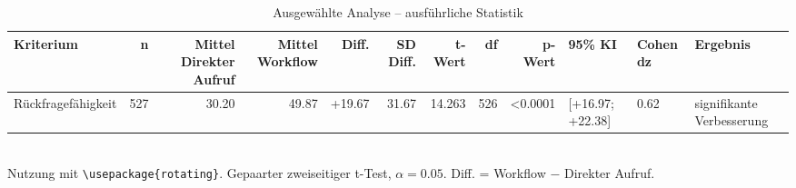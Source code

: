 \begin{table}
\centering
\caption{Ausgewählte Analyse -- ausführliche Statistik}
\begin{tabular}{lrrrrrrrrlll}
\toprule
Kriterium & n & Mittel Direkter Aufruf & Mittel Workflow & Diff. & SD Diff. & t-Wert & df & p-Wert & 95\% KI & Cohen dz & Ergebnis \\
\midrule
Rückfragefähigkeit & 527 & 30.20 & 49.87 & +19.67 & 31.67 & 14.263 & 526 & <0.0001 & [+16.97; +22.38] & 0.62 & signifikante Verbesserung \\
\bottomrule
\end{tabular}
\\[2mm]
\footnotesize Nutzung mit \texttt{\textbackslash usepackage\{rotating\}}. Gepaarter zweiseitiger t-Test, $\alpha=0.05$. Diff. = Workflow $-$ Direkter Aufruf.
\end{table}
